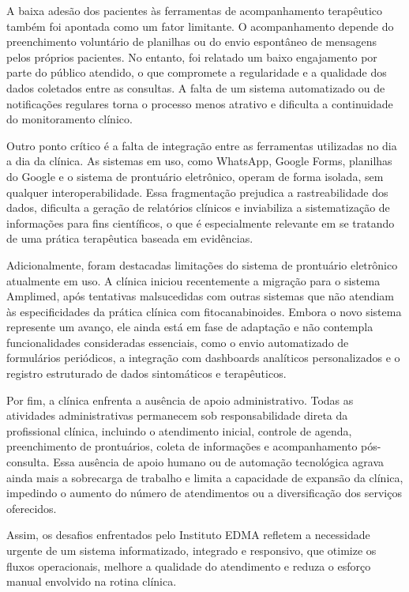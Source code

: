 \href{}{}\documentclass[12pt,portuguese,oneside]{article}
\begin{document}
A baixa adesão dos pacientes às ferramentas de acompanhamento terapêutico também foi apontada como um fator limitante. O acompanhamento depende do preenchimento voluntário de planilhas ou do envio espontâneo de mensagens pelos próprios pacientes. No entanto, foi relatado um baixo engajamento por parte do público atendido, o que compromete a regularidade e a qualidade dos dados coletados entre as consultas. A falta de um sistema automatizado ou de notificações regulares torna o processo menos atrativo e dificulta a continuidade do monitoramento clínico.

Outro ponto crítico é a falta de integração entre as ferramentas utilizadas no dia a dia da clínica. As sistemas em uso, como WhatsApp, Google Forms, planilhas do Google e o sistema de prontuário eletrônico, operam de forma isolada, sem qualquer interoperabilidade. Essa fragmentação prejudica a rastreabilidade dos dados, dificulta a geração de relatórios clínicos e inviabiliza a sistematização de informações para fins científicos, o que é especialmente relevante em se tratando de uma prática terapêutica baseada em evidências.

Adicionalmente, foram destacadas limitações do sistema de prontuário eletrônico atualmente em uso. A clínica iniciou recentemente a migração para o sistema Amplimed, após tentativas malsucedidas com outras sistemas que não atendiam às especificidades da prática clínica com fitocanabinoides. Embora o novo sistema represente um avanço, ele ainda está em fase de adaptação e não contempla funcionalidades consideradas essenciais, como o envio automatizado de formulários periódicos, a integração com dashboards analíticos personalizados e o registro estruturado de dados sintomáticos e terapêuticos.

Por fim, a clínica enfrenta a ausência de apoio administrativo. Todas as atividades administrativas permanecem sob responsabilidade direta da profissional clínica, incluindo o atendimento inicial, controle de agenda, preenchimento de prontuários, coleta de informações e acompanhamento pós-consulta. Essa ausência de apoio humano ou de automação tecnológica agrava ainda mais a sobrecarga de trabalho e limita a capacidade de expansão da clínica, impedindo o aumento do número de atendimentos ou a diversificação dos serviços oferecidos.

Assim, os desafios enfrentados pelo Instituto EDMA refletem a necessidade urgente de um sistema informatizado, integrado e responsivo, que otimize os fluxos operacionais, melhore a qualidade do atendimento e reduza o esforço manual envolvido na rotina clínica.
\end{document}
